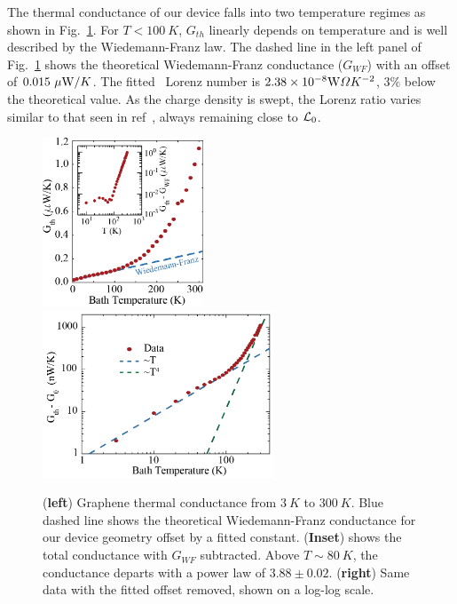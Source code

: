 The thermal conductance of our device falls into two temperature regimes as shown in Fig.~\ref{fig:Aria_Gth}. For $T<100~K$, $G_{th}$ linearly depends on temperature and is well described by the Wiedemann-Franz law. The dashed line in the left panel of Fig.~\ref{fig:Aria_Gth} shows the theoretical Wiedemann-Franz conductance ($G_{WF}$) with an offset of $0.015~\mu\mathrm{W}/K$. The fitted~\cite{fong_measurement_2013, yigen_wiedemannfranz_2014} Lorenz number is $2.38\times10^{-8} \mathrm{W}\Omega K^{-2}$, $3\%$ below the theoretical value. As the charge density is swept, the Lorenz ratio varies similar to that seen in ref~\cite{fong_measurement_2013}, always remaining close to $\mathcal{L}_0$.
\begin{figure}
\centering
\includegraphics[height=50mm, valign=t]{figures/high_density_graphene/Gth_lin.png}
\includegraphics[height=50mm, valign=t]{figures/high_density_graphene/Gth_log.png}
\caption{(\textbf{left}) Graphene thermal conductance from $3~K$ to $300~K$. Blue dashed line shows the theoretical Wiedemann-Franz conductance for our device geometry offset by a fitted constant. (\textbf{Inset}) shows the total conductance with $G_{WF}$ subtracted. Above $T\sim 80~K$, the conductance departs with a power law of $3.88 \pm 0.02$. (\textbf{right}) Same data with the fitted offset removed, shown on a log-log scale.}
\label{fig:Aria_Gth}
\end{figure}

